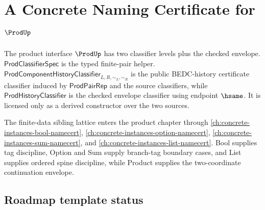 \chapter{A Concrete Naming Certificate for \(\ProdUp\)}
\label{ch:concrete-instances-prod-namecert}

The product interface $\ProdUp$ has two classifier levels plus the checked envelope. $\mathsf{ProdClassifierSpec}$ is the typed finite-pair helper. $\mathsf{ProdComponentHistoryClassifier}_{L,R,\sim_L,\sim_R}$ is the public BEDC-history certificate classifier induced by $\mathsf{ProdPairRep}$ and the source classifiers, while $\mathsf{ProdHistoryClassifier}$ is the checked envelope classifier using endpoint $\hsame$. It is licensed only as a derived constructor over the two sources.

The finite-data sibling lattice enters the product chapter through \autoref{ch:concrete-instances-bool-namecert}, \autoref{ch:concrete-instances-option-namecert}, \autoref{ch:concrete-instances-sum-namecert}, and \autoref{ch:concrete-instances-list-namecert}. Bool supplies tag discipline, Option and Sum supply branch-tag boundary cases, and List supplies ordered spine discipline, while Product supplies the two-coordinate continuation envelope.

\section{Roadmap template status}


